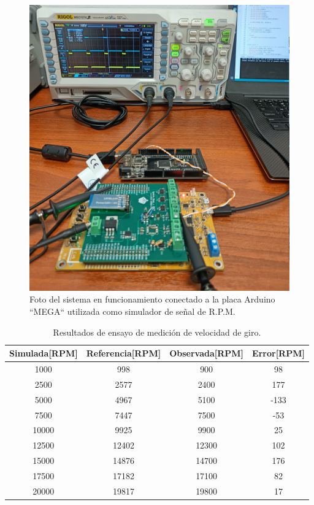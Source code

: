 \begin{figure}[htpb]
\centering
\includegraphics[width=.8\textwidth]{./Figures/foto-rpm.jpg}
\caption{Foto del sistema en funcionamiento conectado a la placa Arduino ``MEGA`` utilizada como simulador de señal de R.P.M.}
\label{fig:foto-rpm}
\end{figure}

\begin{table}[htpb]
	\centering
	\caption{Resultados de ensayo de medición de velocidad de giro.}
	\centering
	\begin{tabular}{c c c c}    
		\toprule
		\textbf{Simulada[RPM]} &  \textbf{Referencia[RPM]}   & \textbf{Observada[RPM]} & \textbf{Error[RPM]}\\
		\midrule
		1000	&	998 &	900 & 98\\
		2500	&	2577 & 2400 & 177\\
		5000	&	4967 & 5100 & -133 \\
		7500	&	7447 & 7500 & -53\\
		10000	&	9925 & 9900 & 25\\
		12500	&	12402 & 12300 & 102\\
		15000	&	14876 & 14700 & 176\\
		17500	&	17182 & 17100 & 82\\
		20000	&	19817 & 19800 & 17\\		
		\bottomrule
	\end{tabular}
	\label{tab:ensayo-rpm}
\end{table}

